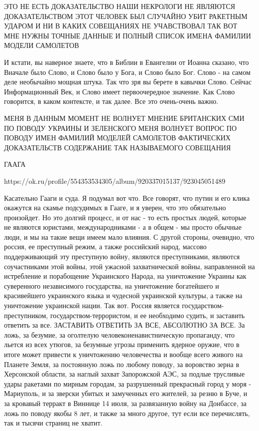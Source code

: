 ЭТО НЕ ЕСТЬ ДОКАЗАТЕЛЬСТВО НАШИ НЕКРОЛОГИ НЕ ЯВЛЯЮТСЯ ДОКАЗАТЕЛЬСТВОМ ЭТОТ
ЧЕЛОВЕК БЫЛ СЛУЧАЙНО УБИТ РАКЕТНЫМ УДАРОМ И НИ В КАКИХ СОВЕЩАНИЯХ НЕ
УЧАВСТВОВАЛ ТАК ВОТ МНЕ НУЖНЫ ТОЧНЫЕ ДАННЫЕ И ПОЛНЫЙ СПИСОК ИМЕНА ФАМИЛИИ
МОДЕЛИ САМОЛЕТОВ


И кстати, вы наверное знаете, что в Библии в Евангелии от Иоанна сказано, что
Вначале было Слово, и Слово было у Бога, и Слово было Бог. Слово - на самом
деле необычайно мощная штука. Так что зря вы берете в кавычки Слово. Сейчас
Информационный Век, и Слово имеет первоочередное значение. Как Слово говорится,
в каком контексте, и так далее. Все это очень-очень важно.


МЕНЯ В ДАННЫМ МОМЕНТ НЕ ВОЛНУЕТ МНЕНИЕ БРИТАНСКИХ СМИ ПО ПОВОДУ УКРАИНЫ И
ЗЕЛЕНСКОГО МЕНЯ ВОЛНУЕТ ВОПРОС ПО ПОВОДУ ИМЕН ФАМИЛИЙ МОДЕЛЕЙ САМОЛЕТОВ
ФАКТИЧЕСКИХ ДОКАЗАТЕЛЬСТВ СОДЕРЖАНИЕ ТАК НАЗЫВАЕМОГО СОВЕЩАНИЯ

ГААГА

https://ok.ru/profile/554353534305/album/920337015137/923045051489

Касательно Гааги и суда. Я подумал вот что. Все говорят, что путин и его клика
окажутся на скамье подсудимых в Гааге, и я уверен, что это обязательно
произойдет. Но это долгий процесс, и от нас - то есть простых людей, которые не
являются юристами, международниками - а в общем - мы просто обычные люди, и мы
на такие вещи имеем мало влияния. С другой стороны, очевидно, что россия, ее
преступный режим, а также российский народ, массово поддерживающий эту
преступную войну, являются преступниками, являются соучастниками этой войны,
этой ужасной захватнической войны, направленной на истребление и порабощение
Украинского Народа, на уничтожение Украины как суверенного независимого
государства, на уничтожение богатейшего и красивейшего украинского языка и
чудесной украинской культуры, а также на уничтожение украинской нации. Так вот.
Россия является государством-преступником, государством-террористом, и ее
необходимо судить, и заставить ответить за все. ЗАСТАВИТЬ ОТВЕТИТЬ ЗА ВСЕ,
АБСОЛЮТНО ЗА ВСЕ. За ложь, за безумие, за оголтелую человеконенавистническую
пропаганду, что льется из всех утюгов, за безумные угрозы применить ядерное
оружие, что в итоге может привести к уничтожению человечества и вообще всего
живого на Планете Земля, за постоянную ложь по любому поводу, за воровство
зерна в Херсонской области, за наглый захват Запорожской АЭС, за подлые
трусливые удары ракетами по мирным городам, за разрушенный прекрасный город у
моря - Мариуполь, и за зверски убитых и замученных его жителей, за резню в
Буче, и за кровавый терракт в Виннице 14 июля, за развязанную войну на
Донбассе, за ложь по поводу якобы 8 лет, и также за много другое, тут если все
перечислять, так и тысячи страниц не хватит.

